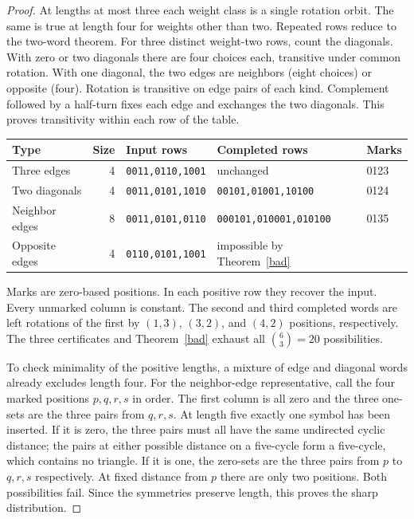 \documentclass[11pt]{article}
\newcommand{\w}[1]{\texttt{#1}}
\begin{document}
\begin{proof}
At lengths at most three each weight class is a single rotation orbit. The same is true at length four for weights other than two. Repeated rows reduce to the two-word theorem. For three distinct weight-two rows, count the diagonals. With zero or two diagonals there are four choices each, transitive under common rotation. With one diagonal, the two edges are neighbors (eight choices) or opposite (four). Rotation is transitive on edge pairs of each kind. Complement followed by a half-turn fixes each edge and exchanges the two diagonals. This proves transitivity within each row of the table.

\begin{center}\small
\begin{tabular}{@{}lrl l l@{}}
\toprule
Type & Size & Input rows & Completed rows & Marks\\
\midrule
Three edges & 4 & \w{0011,0110,1001} & unchanged & 0123\\
Two diagonals & 4 & \w{0011,0101,1010} & \w{00101,01001,10100} & 0124\\
Neighbor edges & 8 & \w{0011,0101,0110} & \w{000101,010001,010100} & 0135\\
Opposite edges & 4 & \w{0110,0101,1001} & impossible by Theorem~\ref{bad} & \\
\bottomrule
\end{tabular}
\end{center}
Marks are zero-based positions. In each positive row they recover the input. Every unmarked column is constant. The second and third completed words are left rotations of the first by $(1,3)$, $(3,2)$, and $(4,2)$ positions, respectively. The three certificates and Theorem~\ref{bad} exhaust all $\binom63=20$ possibilities.

To check minimality of the positive lengths, a mixture of edge and diagonal words already excludes length four. For the neighbor-edge representative, call the four marked positions $p,q,r,s$ in order. The first column is all zero and the three one-sets are the three pairs from $q,r,s$. At length five exactly one symbol has been inserted. If it is zero, the three pairs must all have the same undirected cyclic distance; the pairs at either possible distance on a five-cycle form a five-cycle, which contains no triangle. If it is one, the zero-sets are the three pairs from $p$ to $q,r,s$ respectively. At fixed distance from $p$ there are only two positions. Both possibilities fail. Since the symmetries preserve length, this proves the sharp distribution.
\end{proof}
\end{document}
